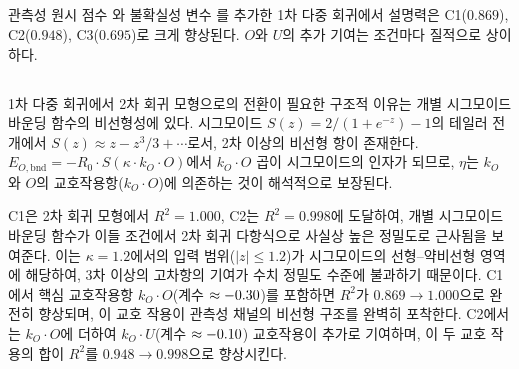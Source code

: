 \subsection{}
\label{subsec:ch5_multi_r2}

관측성 원시 점수 와 불확실성 변수 를 추가한 1차 다중 회귀에서
설명력은 C1($0.869$), C2($0.948$), C3($0.695$)로 크게 향상된다.
$O$와 $U$의 추가 기여는 조건마다 질적으로 상이하다.



\subsection{}
\label{subsec:ch5_quad_necessity}

1차 다중 회귀에서 2차 회귀 모형으로의 전환이 필요한 구조적 이유는
개별 시그모이드 바운딩 함수의 비선형성에 있다.
시그모이드 $S(z) = 2/(1+e^{-z})-1$의 테일러 전개에서
$S(z) \approx z - z^3/3 + \cdots$로서, 2차 이상의 비선형 항이 존재한다.
$E_{O,\text{bnd}} = -R_0 \cdot S(\kappa \cdot k_O \cdot O)$에서
$k_O \cdot O$ 곱이 시그모이드의 인자가 되므로,
$\eta$는 $k_O$와 $O$의 교호작용항($k_O \cdot O$)에 의존하는 것이
해석적으로 보장된다.

C1은 2차 회귀 모형에서 $R^2 = 1.000$, C2는 $R^2 = 0.998$에 도달하여, 개별 시그모이드 바운딩 함수가
이들 조건에서 2차 회귀 다항식으로 사실상 높은 정밀도로 근사됨을 보여준다.
이는 $\kappa = 1.2$에서의 입력 범위($|z| \leq 1.2$)가 시그모이드의
선형--약비선형 영역에 해당하여, 3차 이상의 고차항의 기여가
수치 정밀도 수준에 불과하기 때문이다.
C1에서 핵심 교호작용항 $k_O \cdot O$(계수 $\approx \erf{-0.30}{-0.546}$)를 포함하면
$R^2$가 $0.869 \to 1.000$으로 완전히 향상되며,
이 교호 작용이 관측성 채널의 비선형 구조를 완벽히 포착한다.
C2에서는 $k_O \cdot O$에 더하여 $k_O \cdot U$(계수 $\approx \erf{-0.10}{-0.43}$)
교호작용이 추가로 기여하며, 이 두 교호 작용의 합이 $R^2$를
$0.948 \to 0.998$으로 향상시킨다.

